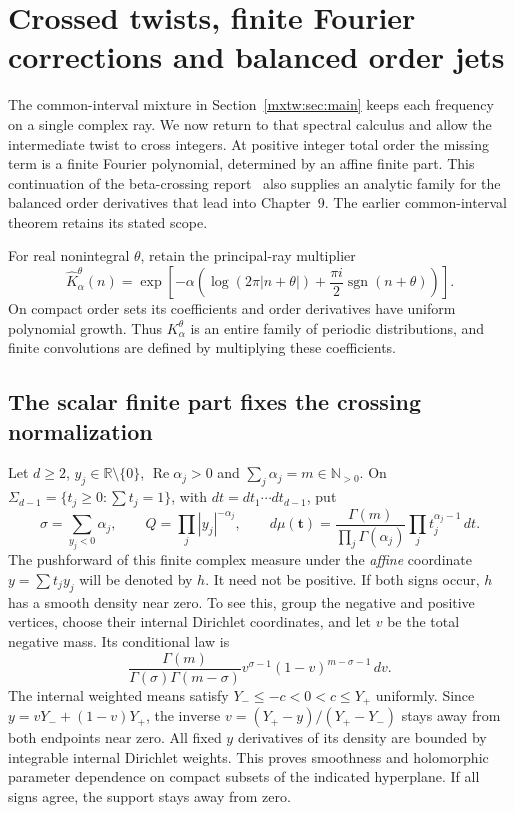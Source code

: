 \section{Crossed twists, finite Fourier corrections and balanced order jets}
\label{btc:section}
The common-interval mixture in Section~\ref{mxtw:sec:main} keeps each
frequency on a single complex ray. We now return to that spectral calculus
and allow the intermediate twist to cross integers. At positive integer
total order the missing term is a finite Fourier polynomial, determined by
an affine finite part. This continuation of the beta-crossing
report~\cite{btc:report} also supplies an analytic family for the balanced
order derivatives that lead into Chapter~9. The earlier common-interval
theorem retains its stated scope.

For real nonintegral $\theta$, retain the principal-ray multiplier
\[
 \widehat K_\alpha^\theta(n)=
 \exp\!\left[-\alpha\left(\log(2\pi|n+\theta|)
                +\frac{\pi i}{2}\operatorname{sgn}(n+\theta)\right)\right].
\]
On compact order sets its coefficients and order derivatives have uniform
polynomial growth. Thus $K_\alpha^\theta$ is an entire family of periodic
distributions, and finite convolutions are defined by multiplying these
coefficients.

\subsection{The scalar finite part fixes the crossing normalization}
Let $d\ge2$, $y_j\in\mathbb R\setminus\{0\}$,
$\operatorname{Re}\alpha_j>0$ and $\sum_j\alpha_j=m\in\mathbb N_{>0}$.
On $\Sigma_{d-1}=\{t_j\ge0:\sum t_j=1\}$, with
$dt=dt_1\cdots dt_{d-1}$, put
\[
 \sigma=\sum_{y_j<0}\alpha_j,\qquad
 Q=\prod_j|y_j|^{-\alpha_j},\qquad
 d\mu(\mathbf t)=\frac{\Gamma(m)}{\prod_j\Gamma(\alpha_j)}
                         \prod_jt_j^{\alpha_j-1}\,dt.
\]
The pushforward of this finite complex measure under the \emph{affine}
coordinate $y=\sum t_jy_j$ will be denoted by $h$. It need not be positive.
If both signs occur, $h$ has a smooth density near zero. To see this,
group the negative and positive vertices, choose their internal Dirichlet
coordinates, and let $v$ be the total negative mass. Its conditional law is
\[
 \frac{\Gamma(m)}{\Gamma(\sigma)\Gamma(m-\sigma)}
                    v^{\sigma-1}(1-v)^{m-\sigma-1}\,dv.
\]
The internal weighted means satisfy $Y_-\le-c<0<c\le Y_+$ uniformly.
Since $y=vY_-+(1-v)Y_+$, the inverse
$v=(Y_+-y)/(Y_+-Y_-)$ stays away from both endpoints near zero.
All fixed $y$ derivatives of its density are bounded by integrable
internal Dirichlet weights. This proves smoothness and holomorphic
parameter dependence on compact subsets of the indicated hyperplane.
If all signs agree, the support stays away from zero.

